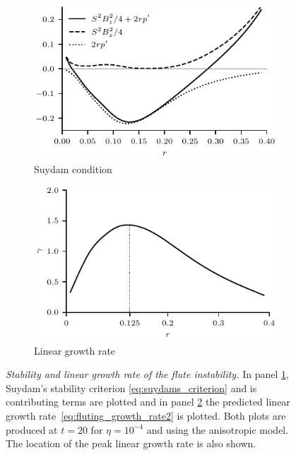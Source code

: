\documentclass[fleqn,usenatbib]{mnras}
\newcommand{\rs}[2]{{#2}}
\newcommand{\mycaption}[2]{\caption[#1]{\emph{#1} #2}}
\begin{document}
\begin{figure}
  \centering
    \begin{subfigure}{0.49\textwidth}
      \includegraphics[width=\linewidth]{suydam_condition_4.pdf}
      \caption{Suydam condition}
      \label{fig:suydam_condition_4}
    \end{subfigure}
    \hfill
    \begin{subfigure}{0.49\textwidth}
      \includegraphics[width=\linewidth]{growth_rate_4.pdf}
      \caption{Linear growth rate}
      \label{fig:growth_rate_4}
    \end{subfigure}
\mycaption{Stability and linear growth rate of the flute
  instability.}{In \rs{}{panel} \ref{fig:suydam_condition_4}, Suydam's stability
  criterion \rs{}{\eqref{eq:suydams_criterion}} and is contributing
  terms \rs{(LHS of~\eqref{eq:suydams_criterion})}{}  are plotted and in
  \rs{}{panel} \ref{fig:growth_rate_4} the predicted linear growth rate~\eqref{eq:fluting_growth_rate2} is plotted. Both plots are produced at $t=20$ for $\eta=10^{-4}$ and using the \rs{switching}{anisotropic} model. The location of the peak linear growth rate is also shown.}
\label{fig:stability_and_growth}%
\end{figure}
\end{document}
